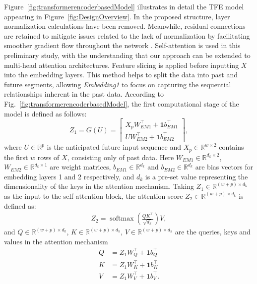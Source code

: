 \documentclass{ifacconf}
\DeclareMathOperator{\softmax}{softmax}
\begin{document}
Figure~\ref{fig:transformerencoderbasedModel} illustrates in detail the TFE model appearing in Figure~\ref{fig:DesignOverview}. In the proposed structure, layer normalization calculations have been removed. Meanwhile, residual connections are retained to mitigate issues related to the lack of normalization by facilitating smoother gradient flow throughout the network \citep{he2016deep}. Self-attention is used in this preliminary study, with the understanding that our approach can be extended to multi-head attention architectures. Feature slicing is applied before inputting \(X\) into the  embedding layers. This method helps to split the data into past and future segments, allowing \textit{Embedding1} to focus on capturing the sequential relationships inherent in the past data. According to Fig.~\ref{fig:transformerencoderbasedModel}, the first computational stage of the model is defined as follows:
\begin{equation}
\label{fun:Z1}
    Z_1 = G(U) = \begin{bmatrix}
        X_pW_{EM1}^\top + \mathbf{1}b_{EM1}^\top \\
        U W_{EM2}^\top + \mathbf{1}b_{EM2}^\top
        \end{bmatrix} ,
\end{equation}
where \(U \in \mathbb{R}^{p}\) is the anticipated future input sequence and \(X_p\in \mathbb{R}^{w \times 2}\) contains the first $w$ rows of $X$, consisting only of past data. 
Here \(W_{EM1} \in \mathbb{R}^{d_k \times 2}\), \(W_{EM2} \in \mathbb{R}^{d_k \times 1}\) are weight matrices, \(b_{EM1} \in \mathbb{R}^{d_k}\) and \(b_{EM2} \in \mathbb{R}^{d_k}\) are bias vectors for embedding layers 1 and 2 respectively, and
\(d_k\) is a pre-set value representing the dimensionality of the keys in the attention mechanism. Taking \(Z_1 \in \mathbb{R}^{(w+p) \times d_k}\) as the input to the self-attention block, the attention score \(Z_2 \in \mathbb{R}^{(w+p) \times d_k}\) is defined as: 
\begin{equation}
\label{fun:Z2}
  \begin{aligned}
    Z_2 = \softmax(\frac{QK^\top}{\sqrt{d_k}})V,
  \end{aligned}
\end{equation}
and \(Q \in \mathbb{R}^{(w+p) \times d_k}\), \(K \in \mathbb{R}^{(w+p) \times d_k}\), \(V \in \mathbb{R}^{(w+p) \times d_k}\) are the queries, keys and values in the attention mechanism
\begin{equation}
\label{fun:QKV}
  \begin{aligned}
    Q &= Z_1W_Q^\top + \mathbf{1}b_Q^\top \\
    K &= Z_1W_K^\top + \mathbf{1}b_K^\top \\
    V &= Z_1W_V^\top + \mathbf{1}b_V^\top.
  \end{aligned}
\end{equation}
\end{document}
